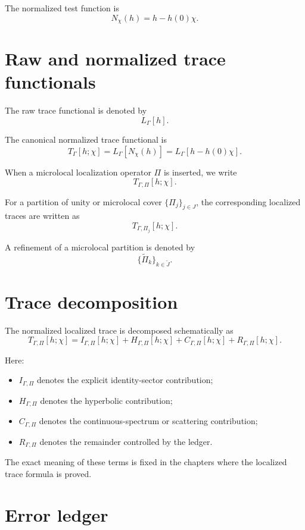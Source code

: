 The normalized test function is
\[
  N_\chi(h)=h-h(0)\chi.
\]

\section*{Raw and normalized trace functionals}

The raw trace functional is denoted by
\[
  L_\Gamma[h].
\]

The canonical normalized trace functional is
\[
  T_\Gamma[h;\chi]
  =
  L_\Gamma[N_\chi(h)]
  =
  L_\Gamma[h-h(0)\chi].
\]

When a microlocal localization operator \(\Pi\) is inserted, we write
\[
  T_{\Gamma,\Pi}[h;\chi].
\]

For a partition of unity or microlocal cover \(\{\Pi_j\}_{j\in J}\), the corresponding localized traces are written as
\[
  T_{\Gamma,\Pi_j}[h;\chi].
\]

A refinement of a microlocal partition is denoted by
\[
  \{\widetilde\Pi_k\}_{k\in\widetilde J}.
\]

\section*{Trace decomposition}

The normalized localized trace is decomposed schematically as
\[
  T_{\Gamma,\Pi}[h;\chi]
  =
  I_{\Gamma,\Pi}[h;\chi]
  +
  H_{\Gamma,\Pi}[h;\chi]
  +
  C_{\Gamma,\Pi}[h;\chi]
  +
  R_{\Gamma,\Pi}[h;\chi].
\]

Here:

\begin{itemize}
  \item \(I_{\Gamma,\Pi}\) denotes the explicit identity-sector contribution;
  \item \(H_{\Gamma,\Pi}\) denotes the hyperbolic contribution;
  \item \(C_{\Gamma,\Pi}\) denotes the continuous-spectrum or scattering contribution;
  \item \(R_{\Gamma,\Pi}\) denotes the remainder controlled by the ledger.
\end{itemize}

The exact meaning of these terms is fixed in the chapters where the localized trace formula is proved.

\section*{Error ledger}

